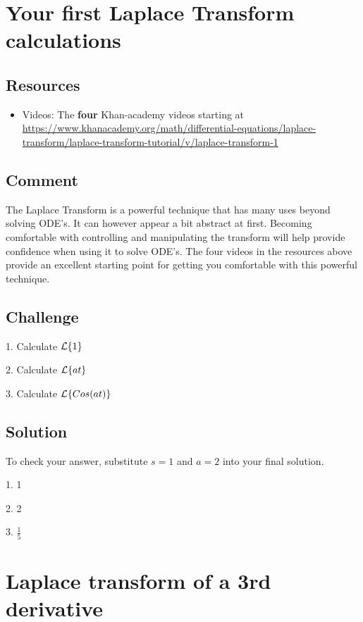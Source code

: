 \section{Your first Laplace Transform calculations}

\subsection*{Resources}
\begin{itemize}
    \item Videos: The \textbf{four} Khan-academy videos starting at \url{https://www.khanacademy.org/math/differential-equations/laplace-transform/laplace-transform-tutorial/v/laplace-transform-1} %
\end{itemize}

\subsection*{Comment}
The Laplace Transform is a powerful technique that has many uses beyond solving ODE's. It can however appear a bit abstract at first. Becoming comfortable with controlling and manipulating the transform will help provide confidence when using it to solve ODE's. The four videos in the resources above provide an excellent starting point for getting you comfortable with this powerful technique.

\subsection*{Challenge}
1. Calculate $\mathcal{L}\{1\}$

2. Calculate $\mathcal{L}\{at\}$

3. Calculate $\mathcal{L}\{Cos(at)\}$

\subsection*{Solution}
To check your answer, substitute $s=1$ and $a=2$ into your final solution.

1. 1

2. 2

3. $\frac{1}{5}$




\newpage
\section{Laplace transform of a 3rd derivative}


